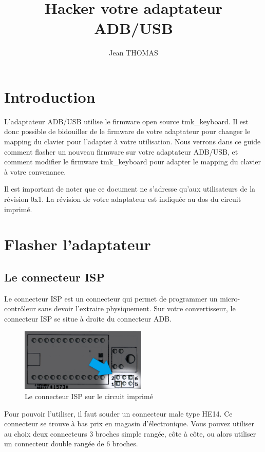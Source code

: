 \documentclass[12pt,a4paper,final]{article}
\title{Hacker votre adaptateur ADB/USB}
\author{Jean THOMAS}
\date{}
\begin{document}
\maketitle

\section{Introduction}

L'adaptateur ADB/USB utilise le firmware open source tmk\_keyboard. Il est donc possible de bidouiller de le firmware de votre adaptateur pour changer le mapping du clavier pour l'adapter à votre utilisation. Nous verrons dans ce guide comment flasher un nouveau firmware sur votre adaptateur ADB/USB, et comment modifier le firmware tmk\_keyboard pour adapter le mapping du clavier à votre convenance.

Il est important de noter que ce document ne s'adresse qu'aux utilisateurs de la révision 0x1. La révision de votre adaptateur est indiquée au dos du circuit imprimé.

\section{Flasher l'adaptateur}

\subsection{Le connecteur ISP}

Le connecteur ISP est un connecteur qui permet de programmer un micro-contrôleur sans devoir l'extraire physiquement. Sur votre convertisseur, le connecteur ISP se situe à droite du connecteur ADB.

\begin{figure}[h]
    \centering
    \includegraphics[width=6cm]{isp_connector.jpg}
    \caption{Le connecteur ISP sur le circuit imprimé}
    \label{fig:1}
\end{figure}

\FloatBarrier

Pour pouvoir l'utiliser, il faut souder un connecteur male type HE14. Ce connecteur se trouve à bas prix en magasin d'électronique. Vous pouvez utiliser au choix deux connecteurs 3 broches simple rangée, côte à côte, ou alors utiliser un connecteur double rangée de 6 broches.
\end{document}
